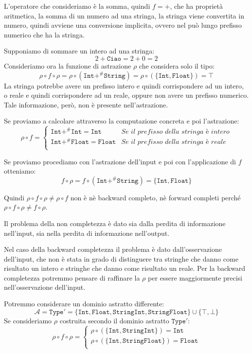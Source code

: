 L'operatore che consideriamo è la somma, quindi $f = +$, che ha proprietà aritmetica, 
la somma di un numero ad una stringa, la stringa viene convertita in numero, quindi avviene 
una conversione implicita, ovvero nel può lungo prefisso numerico che ha la stringa.

Supponiamo di sommare un intero ad una stringa:
\[
    2 + \texttt{Ciao} = 2 + 0 = 2
\]
Consideriamo ora la funzione di astrazione $\rho$ che considera solo il tipo:
\[
  \rho \circ f \circ \rho = \rho \circ (\texttt{Int} +^\# \texttt{String}) = 
  \rho \circ (\{ \texttt{Int}, \texttt{Float} \}) = \top
\]
La stringa potrebbe avere un prefisso intero e quindi corrispondere ad un intero, o 
reale e quindi corrispondere ad un reale, oppure non avere un prefisso numerico. 
Tale informazione, però, non è presente nell'astrazione.

Se proviamo a calcolare attraverso la computazione concreta e poi l'astrazione:
\[
    \rho \circ f = 
    \begin{cases}
        \texttt{Int} +^\# \texttt{Int} = \texttt{Int}  & \textit{Se il prefisso della stringa è intero}\\
        \texttt{Int} +^\# \texttt{Float} = \texttt{Float} & \textit{Se il prefisso della stringa è reale}\\
    \end{cases}
\]

Se proviamo procediamo con l'astrazione dell'input e poi con l'applicazione di $f$ otteniamo:
\[
    f \circ \rho = f \circ (\texttt{Int} +^\# \texttt{String}) = \{ \texttt{Int}, \texttt{Float} \}
\]
\begin{tcolorbox}
    Quindi $\rho \circ f \circ \rho \not = \rho \circ f $ non è nè backward completo, nè 
    forward completi perché $\rho \circ f \circ \rho \not = f \circ \rho$.
\end{tcolorbox}
Il problema della non completezza è dato sia dalla perdita di informazione nell'input, 
sia nella perdita di informazione nell'output.

Nel caso della backward completezza il problema è dato dall'osservazione dell'input, che 
non è stata in grado di distinguere tra stringhe che danno come risultato un intero e stringhe 
che danno come risultato un reale.
Per la backward completezza potremmo pensare di raffinare la $\rho$ per essere maggiormente 
precisi nell'osservazione dell'input. 

Potremmo considerare un dominio astratto differente:
\[
    \mathcal{A} = \texttt{Type}' = \{\texttt{Int}, \texttt{Float},
    \texttt{StringInt}, \texttt{StringFloat}\} \cup \{\top, \bot\}
\]
Se consideriamo $\rho$ costruita secondo il dominio astratto $\texttt{Type}'$:
\[
    \rho \circ f \circ \rho = 
    \begin{cases}
        \rho \circ (\{ \texttt{Int}, \texttt{StringInt} \}) = \texttt{Int} \\
        \rho \circ (\{ \texttt{Int}, \texttt{StringFloat} \}) = \texttt{Float} \\
    \end{cases}
\]

